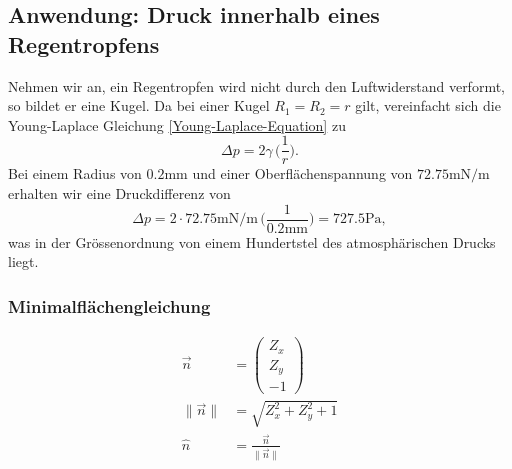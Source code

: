 \begin{refsection}
\subsection{Anwendung: Druck innerhalb eines Regentropfens}
Nehmen wir an, ein Regentropfen wird nicht durch den Luftwiderstand verformt, so bildet er eine Kugel. Da bei einer Kugel $R_1=R_2=r$ gilt, vereinfacht sich die Young-Laplace Gleichung \ref{Young-Laplace-Equation} zu
\begin{equation}
\Delta p = 2\gamma \, \bigg(\frac{1}{r}\bigg).
\end{equation}
Bei einem Radius von $0.2\text{mm}$ und einer Oberflächenspannung von $72.75 \text{mN}/\text{m}$ erhalten wir eine Druckdifferenz von
\begin{equation}
\Delta p = 2 \cdot 72.75 \text{mN}/\text{m} \, \bigg(\frac{1}{0.2\text{mm}}\bigg)= 727.5 \text{Pa},
\end{equation}
was in der Grössenordnung von einem Hundertstel des atmosphärischen Drucks liegt. 


\iffalse
\subsubsection{Minimalflächengleichung}\label{MFG}
\begin{equation}
\begin{split}
\vec{n} &= \begin{pmatrix}Z_x \\ Z_y \\ -1\end{pmatrix} \\
\|\vec{n}\| &= \sqrt{Z_x^2+Z_y^2+1} \\
\hat{n} &= \frac{\vec{n}}{\|\vec{n}\|} \\
\end{split}
\end{equation}


\end{refsection}
